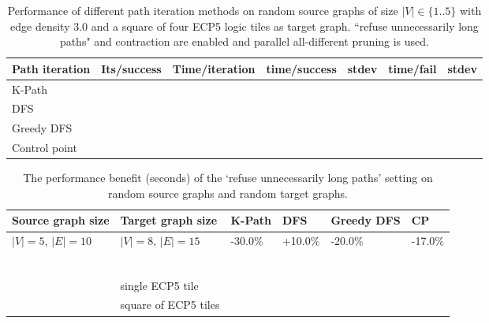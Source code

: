 \begin{table}[ht]
\centering
\begin{tabular}{|l|l|l|l|l|l|l|}
\hline
\textbf{Path iteration} &
  \textbf{Its/success} &
  \textbf{Time/iteration} &
  \textbf{time/success} &
  \textbf{stdev} &
  \textbf{time/fail} &
  \textbf{stdev} \\ \hline
K-Path        &  &  &  &  &  &  \\ \hline
DFS           &  &  &  &  &  &  \\ \hline
Greedy DFS    &  &  &  &  &  &  \\ \hline
Control point &  &  &  &  &  &  \\ \hline
\end{tabular}
\caption{Performance of different path iteration methods on random source graphs of size $|V|\in \{1..5\}$ with edge density 3.0 and a square of four ECP5 logic tiles as target graph. ``refuse unnecessarily long paths" and contraction are enabled and parallel all-different pruning is used.}
\label{tab:iterator-performance}
\end{table}

\begin{table}[ht]
\centering
\begin{tabular}{|l|l|l|l|l|l|}
\hline
\textbf{Source graph size} & \textbf{Target graph size} & \textbf{K-Path} & \textbf{DFS} & \textbf{Greedy DFS} & \textbf{CP} \\ \hline
$|V|=5$, $|E|=10$          & $|V|=8$, $|E|=15$          & -30.0\%                     & +10.0\%          &  -20.0\%                      & -17.0\%               \\ \hline
&&&&&\\\hline
&&&&&\\\hline
&&&&&\\\hline
&&&&&\\\hline
&&&&&\\\hline
&&&&&\\\hline
                           & single ECP5 tile         &                           &                &                        &                \\ \hline
                                                      & square of ECP5 tiles         &                           &                &                        &                \\ \hline
\end{tabular}
\caption{The performance benefit (seconds) of the `refuse unnecessarily long paths' setting on random source graphs and random target graphs.}
\label{tab:refuselongerpaths-performance}
\end{table}




